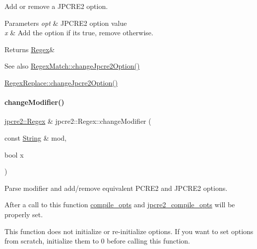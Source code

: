 Add or remove a J\+P\+C\+R\+E2 option. 


\begin{DoxyParams}{Parameters}
{\em opt} & J\+P\+C\+R\+E2 option value \\
\hline
{\em x} & Add the option if it\textquotesingle{}s true, remove otherwise. \\
\hline
\end{DoxyParams}
\begin{DoxyReturn}{Returns}
\hyperlink{classjpcre2_1_1Regex}{Regex}\& 
\end{DoxyReturn}
\begin{DoxySeeAlso}{See also}
\hyperlink{classjpcre2_1_1RegexMatch_a154430c66b8794d6632be6211a3ce870_a154430c66b8794d6632be6211a3ce870}{Regex\+Match\+::change\+Jpcre2\+Option()} 

\hyperlink{classjpcre2_1_1RegexReplace_afebf5e76bce8e312ab6dbdec3288b02b_afebf5e76bce8e312ab6dbdec3288b02b}{Regex\+Replace\+::change\+Jpcre2\+Option()} 
\end{DoxySeeAlso}
\hypertarget{classjpcre2_1_1Regex_a9ab3efed9819a51225456e6d8487de56_a9ab3efed9819a51225456e6d8487de56}{}\label{classjpcre2_1_1Regex_a9ab3efed9819a51225456e6d8487de56_a9ab3efed9819a51225456e6d8487de56} 
\paragraph{\texorpdfstring{change\+Modifier()}{changeModifier()}}
{\footnotesize\ttfamily \hyperlink{classjpcre2_1_1Regex}{jpcre2\+::\+Regex} \& jpcre2\+::\+Regex\+::change\+Modifier (\begin{DoxyParamCaption}\item[{const \hyperlink{namespacejpcre2_a91f03070152fb228bc116c5a737f1d16}{String} \&}]{mod,  }\item[{bool}]{x }\end{DoxyParamCaption})}



Parse modifier and add/remove equivalent P\+C\+R\+E2 and J\+P\+C\+R\+E2 options. 

After a call to this function \hyperlink{classjpcre2_1_1Regex_a5954131e9085de63229ed5c11417df69}{compile\+\_\+opts} and \hyperlink{classjpcre2_1_1Regex_abdd26c3bc1c3132f0aa73dde1690a7ef}{jpcre2\+\_\+compile\+\_\+opts} will be properly set.

This function does not initialize or re-\/initialize options. If you want to set options from scratch, initialize them to 0 before calling this function.

